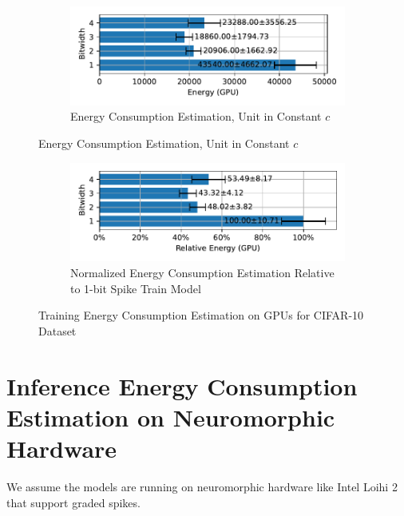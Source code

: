         \begin{figure}[H]
            \centering
            \begin{subfigure}[H]{0.6\textwidth}
                \includegraphics[width=\textwidth]{../standard/CIFAR10/plots/cifar10_train_energy_gpu_horizontal.pdf}
                \caption{Energy Consumption Estimation, Unit in Constant $c$}
            \end{subfigure}
        \end{figure}
        \begin{figure}[H]
            \centering
            \ContinuedFloat
            \begin{subfigure}[H]{0.6\textwidth}
                \includegraphics[width=\textwidth]{../standard/CIFAR10/plots/cifar10_train_relative_energy_gpu_horizontal.pdf}
                \caption{Normalized Energy Consumption Estimation Relative to 1-bit Spike Train Model}
            \end{subfigure}
            \caption{Training Energy Consumption Estimation on GPUs for CIFAR-10 Dataset}
        \end{figure}

\section{Inference Energy Consumption Estimation on Neuromorphic Hardware}
\label{appendix:energy_neuromorphic}

    We assume the models are running on neuromorphic hardware like Intel Loihi 2 that support graded spikes. 

